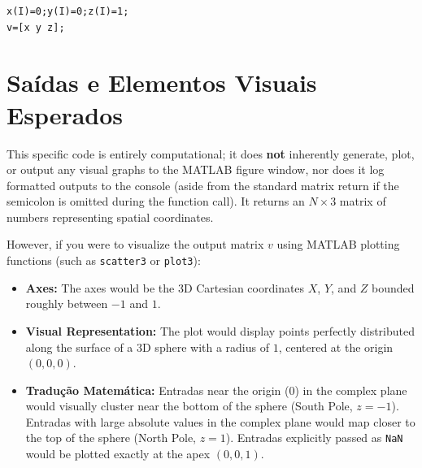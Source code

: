 \begin{lstlisting}
x(I)=0;y(I)=0;z(I)=1;
v=[x y z];
\end{lstlisting}

\section{Saídas e Elementos Visuais Esperados}

This specific code is entirely computational; it does \textbf{not} inherently generate, plot, or output any visual graphs to the MATLAB figure window, nor does it log formatted outputs to the console (aside from the standard matrix return if the semicolon is omitted during the function call). It returns an $N \times 3$ matrix of numbers representing spatial coordinates.

However, if you were to visualize the output matrix $v$ using MATLAB plotting functions (such as \texttt{scatter3} or \texttt{plot3}):
\begin{itemize}
    \item \textbf{Axes:} The axes would be the 3D Cartesian coordinates $X$, $Y$, and $Z$ bounded roughly between $-1$ and $1$.
    \item \textbf{Visual Representation:} The plot would display points perfectly distributed along the surface of a 3D sphere with a radius of $1$, centered at the origin $(0,0,0)$. 
    \item \textbf{Tradução Matemática:} Entradas near the origin ($0$) in the complex plane would visually cluster near the bottom of the sphere (South Pole, $z=-1$). Entradas with large absolute values in the complex plane would map closer to the top of the sphere (North Pole, $z=1$). Entradas explicitly passed as \texttt{NaN} would be plotted exactly at the apex $(0,0,1)$.
\end{itemize}
